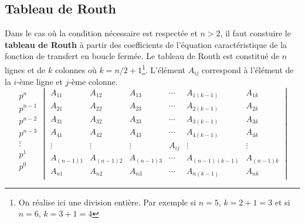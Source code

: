 \subsection{Tableau de Routh}
Dans le cas où la condition nécessaire est respectée et $n>2$, il faut 
constuire le \textbf{tableau de Routh} à partir des coefficients de l'équation 
caractéristique de la fonction de transfert en boucle fermée.
\newpage
\restoregeometry
\captionsetup{width=0.9\linewidth}
Le tableau de Routh est constitué de $n$ lignes et de $k$ colonnes 
où $k=n/2+1$\footnote{On réalise ici une division entière. Par exemple 
si $n=5$, $k=2+1=3$ et si $n=6$, $k=3+1=4$}. L'élément $A_{ij}$ correspond 
à l'élément de la $i$-ème ligne et $j$-ème colonne.
\[
\begin{matrix}
    p^n    \\
    p^{n-1}\\
    p^{n-2}\\
    p^{n-3}\\
    \vdots \\
    p^1    \\
    p^0    \\
\end{matrix}
\begin{vmatrix}
  A_{11}     & A_{12}     & A_{13}     & \cdots & A_{1(k-1)}     & A_{1k}  \\
  A_{21}     & A_{22}     & A_{23}     & \cdots & A_{2(k-1)}     & A_{2k}  \\
  A_{31}     & A_{32}     & A_{33}     & \cdots & A_{3(k-1)}     & A_{3k}  \\
  A_{41}     & A_{42}     & A_{43}     & \cdots & A_{4(k-1)}     & A_{4k}  \\
  \vdots     & \vdots     & \vdots     & A_{ij} & \vdots         & \vdots  \\
  A_{(n-1)1} & A_{(n-1)2} & A_{(n-1)3} & \cdots & A_{(n-1)(k-1)} & A_{(n-1)k}\\
  A_{n1}     & A_{n2}     & A_{n3}     & \cdots & A_{n(k-1)}     & A_{nk}
\end{vmatrix}
\]

